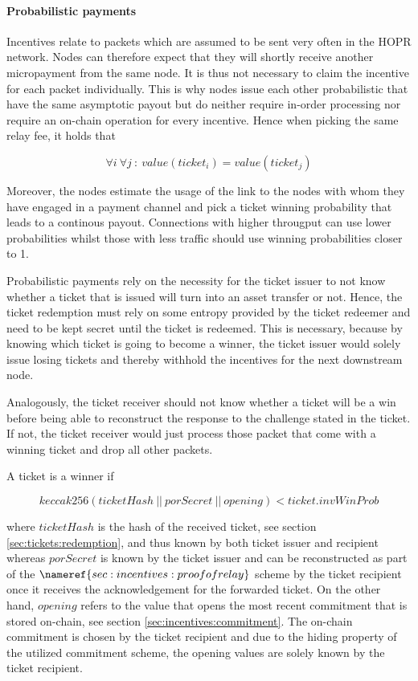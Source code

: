 \paragraph{Probabilistic payments}
\label{sec:incentives:probabilistic:probabilistic}

Incentives relate to packets which are assumed to be sent very often in the HOPR network. Nodes can therefore expect that they will shortly receive another micropayment from the same node. It is thus not necessary to claim the incentive for each packet individually. This is why nodes issue each other probabilistic  that have the same asymptotic payout but do neither require in-order processing nor require an on-chain operation for every incentive. Hence when picking the same relay fee, it holds that

$$ \forall i \ \forall j \ : \ value(ticket_i) = value(ticket_j) $$

Moreover, the nodes estimate the usage of the link to the nodes with whom they have engaged in a payment channel and pick a ticket winning probability that leads to a continous payout. Connections with higher througput can use lower probabilities whilst those with less traffic should use winning probabilities closer to 1.

Probabilistic payments rely on the necessity for the ticket issuer to not know whether a ticket that is issued will turn into an asset transfer or not. Hence, the ticket redemption must rely on some entropy provided by the ticket redeemer and need to be kept secret until the ticket is redeemed. This is necessary, because by knowing which ticket is going to become a winner, the ticket issuer would solely issue losing tickets and thereby withhold the incentives for the next downstream node.

Analogously, the ticket receiver should not know whether a ticket will be a win before being able to reconstruct the response to the challenge stated in the ticket. If not, the ticket receiver would just process those packet that come with a winning ticket and drop all other packets.

A ticket is a winner if

$$ keccak256 ( ticketHash \ || \ porSecret \ || \ opening) < ticket.invWinProb $$

where $ticketHash$ is the hash of the received ticket, see section \ref{sec:tickets:redemption}, and thus known by both ticket issuer and recipient whereas $porSecret$ is known by the ticket issuer and can be reconstructed as part of the $\nameref{sec:incentives:proofofrelay}$ scheme by the ticket recipient once it receives the acknowledgement for the forwarded ticket. On the other hand, $opening$ refers to the value that opens the most recent commitment that is stored on-chain, see section \ref{sec:incentives:commitment}. The on-chain commitment is chosen by the ticket recipient and due to the hiding property of the utilized commitment scheme, the opening values are solely known by the ticket recipient.